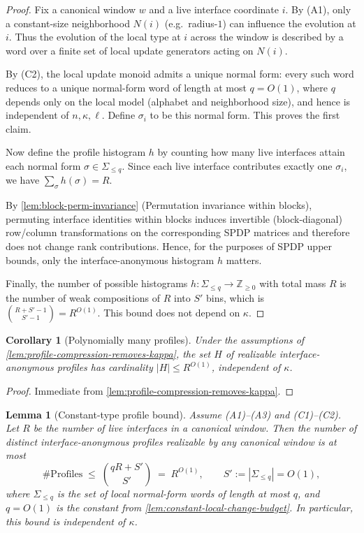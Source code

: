 \documentclass[12pt]{article}
\newtheorem{lemma}[theorem]{Lemma}
\newtheorem{corollary}[theorem]{Corollary}
\theoremstyle{definition}
\theoremstyle{remark}
\begin{document}
\begin{proof}
Fix a canonical window $w$ and a live interface coordinate $i$.
By (A1), only a constant-size neighborhood $N(i)$ (e.g.\ radius-$1$) can influence
the evolution at $i$. Thus the evolution of the local type at $i$ across the
window is described by a word over a finite set of local update generators acting
on $N(i)$.

By (C2), the local update monoid admits a unique normal form: every such word
reduces to a unique normal-form word of length at most $q=O(1)$, where $q$ depends
only on the local model (alphabet and neighborhood size), and hence is independent
of $n,\kappa,\ell$. Define $\sigma_i$ to be this normal form. This proves the first
claim.

Now define the profile histogram $h$ by counting how many live interfaces attain
each normal form $\sigma\in\Sigma_{\le q}$. Since each live interface contributes
exactly one $\sigma_i$, we have $\sum_{\sigma} h(\sigma)=R$.

By \ref{lem:block-perm-invariance} (Permutation invariance within blocks),
permuting interface identities within blocks induces invertible (block-diagonal)
row/column transformations on the corresponding SPDP matrices and therefore does
not change rank contributions. Hence, for the purposes of SPDP upper bounds, only
the interface-anonymous histogram $h$ matters.

Finally, the number of possible histograms $h:\Sigma_{\le q}\to\mathbb{Z}_{\ge 0}$
with total mass $R$ is the number of weak compositions of $R$ into $S'$ bins, which
is $\binom{R+S'-1}{S'-1} = R^{O(1)}$. This bound does not depend on $\kappa$.
\end{proof}

\begin{corollary}[Polynomially many profiles]
\label{cor:poly-many-profiles}
Under the assumptions of \ref{lem:profile-compression-removes-kappa},
the set $H$ of realizable interface-anonymous profiles has cardinality
$|H|\le R^{O(1)}$, independent of $\kappa$.
\end{corollary}

\begin{proof}
Immediate from \ref{lem:profile-compression-removes-kappa}.
\end{proof}

\begin{lemma}[Constant-type profile bound]
\label{lem:constant-type-profile-bound}
Assume (A1)--(A3) and (C1)--(C2). Let $R$ be the number of live interfaces in a
canonical window. Then the number of distinct interface-anonymous profiles
realizable by any canonical window is at most
\[
\#\mathrm{Profiles}
\;\le\;
\binom{qR+S'}{S'}
\;=\;
R^{O(1)},
\qquad
S' := |\Sigma_{\le q}| = O(1),
\]
where $\Sigma_{\le q}$ is the set of local normal-form words of length at most $q$,
and $q=O(1)$ is the constant from \ref{lem:constant-local-change-budget}.
In particular, this bound is independent of $\kappa$.
\end{lemma}
\end{document}
